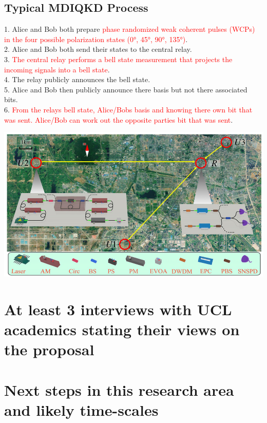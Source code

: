 \documentclass[journal]{vgtc}
\begin{document}
\begin{tcolorbox}
\subsection*{Typical MDIQKD Process}


1. Alice and Bob both prepare \textcolor{red}{phase randomized weak coherent pulses (WCPs) in the four possible polarization states (\ang{0}, \ang{45}, \ang{90}, \ang{135})}.\\
2. Alice and Bob both send their states to the central relay.\\
3. \textcolor{red}{The central relay performs a bell state measurement that projects the incoming signals into a bell state}.\\
4. The relay publicly announces the bell state.\\
5. Alice and Bob then publicly announce there basis but not there associated bits.\\
6. \textcolor{red}{From the relays bell state, Alice/Bobs basis and knowing there own bit that was sent. Alice/Bob can work out the opposite parties bit that was sent}\cite{EPR}.


\includegraphics[width=\linewidth]{map.png}

\end{tcolorbox}

\section{At least 3 interviews with UCL academics stating their views on the proposal}

\section{Next steps in this research area and likely time-scales}

  

\end{document}
